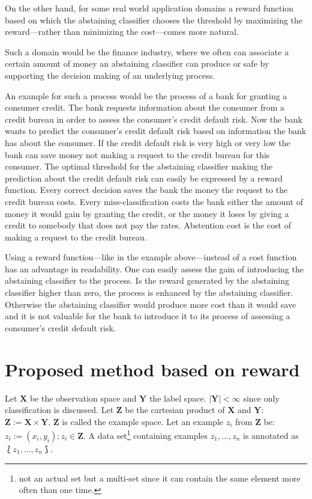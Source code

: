 \documentclass[twoside,11pt]{article}
\def\ds{\Lbag z_1,\dots,z_n \Rbag}
\begin{document}
On the other hand, for some real world application domains
a reward function based on which the abstaining classifier
chooses the threshold by maximizing the reward---rather
than minimizing the cost---comes more natural.

Such a domain would be the finance industry,
where we often can associate a certain amount of money an
abstaining classifier can produce or safe by supporting the
decision making of an underlying process.

An example for such a process would be the process of a
bank for granting a consumer credit.
The bank requests information about the consumer from a
credit bureau in order to assess the consumer's credit
default risk.
Now the bank wants to predict the consumer's credit
default risk based on information the bank has about the
consumer.
If the credit default risk is very high or very low the
bank can save money not making a request to the credit
bureau for this consumer.
The optimal threshold for the abstaining classifier making
the prediction about the credit default risk can easily be
expressed by a reward function.
Every correct decision saves the bank the money the request
to the credit bureau costs.
Every miss-classification costs the bank either the amount
of money it would gain by granting the credit, or the
money it loses by giving a credit to somebody that does not
pay the rates.
Abstention cost is the cost of making a request to the
credit bureau.

Using a reward function---like in the example
above---instead of a cost function has an advantage in
readability. One can easily assess the gain of introducing
the abstaining classifier to the process.
Is the reward generated by the abstaining classifier higher
than zero, the process is enhanced by the abstaining
classifier.
Otherwise the abstaining classifier would produce more
cost than it would save and it is not valuable for the
bank to introduce it to its process of assessing a
consumer's credit default risk.

\section{Proposed method based on reward}
\label{sec:method}

Let $\textbf{X}$ be the observation space and $\textbf{Y}$
the label space. $|\textbf{Y}| < \infty$ since only
classification is discussed. Let $\textbf{Z}$ be the
cartesian product of $\textbf{X}$ and $\textbf{Y}$:
$\textbf{Z} := \textbf{X} \times \textbf{Y}$.
$\textbf{Z}$ is called the example space.
Let an example $z_i$ from $\textbf{Z}$ be:
$z_i := (x_i, y_i); z_i \in \textbf{Z}$.
A data set\footnote{not an actual set but a multi-set since
it can contain the same element more often than one time.}
containing examples $z_1,\dots,z_n$ is annotated as
$\ds$.
\end{document}
